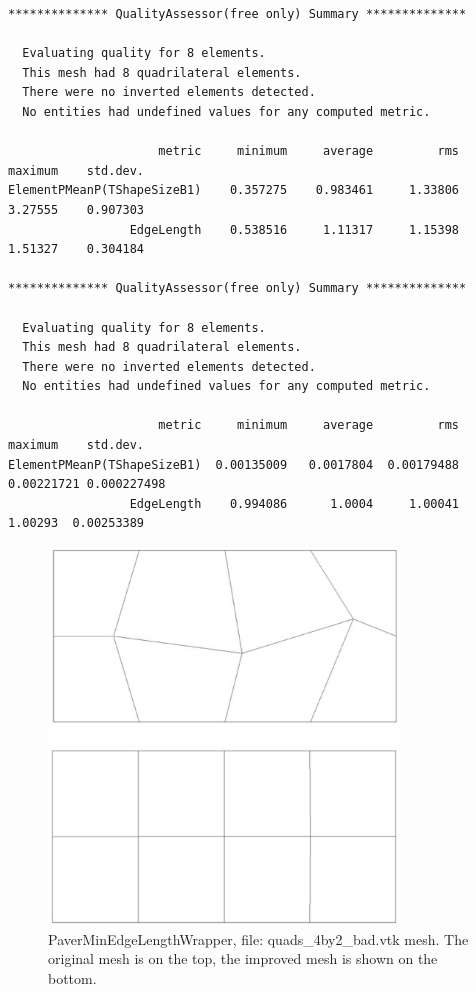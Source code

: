 \begin{verbatim}
************** QualityAssessor(free only) Summary **************

  Evaluating quality for 8 elements.
  This mesh had 8 quadrilateral elements.
  There were no inverted elements detected. 
  No entities had undefined values for any computed metric.

                     metric     minimum     average         rms     maximum    std.dev.
ElementPMeanP(TShapeSizeB1)    0.357275    0.983461     1.33806     3.27555    0.907303
                 EdgeLength    0.538516     1.11317     1.15398     1.51327    0.304184

************** QualityAssessor(free only) Summary **************

  Evaluating quality for 8 elements.
  This mesh had 8 quadrilateral elements.
  There were no inverted elements detected. 
  No entities had undefined values for any computed metric.

                     metric     minimum     average         rms     maximum    std.dev.
ElementPMeanP(TShapeSizeB1)  0.00135009   0.0017804  0.00179488  0.00221721 0.000227498
                 EdgeLength    0.994086      1.0004     1.00041     1.00293  0.00253389
\end{verbatim}


\begin{figure}[htbp]
\begin{center}
    \includegraphics[height=100mm]{min-edge-length.eps}
    \caption{PaverMinEdgeLengthWrapper, file: quads\_4by2\_bad.vtk mesh. The original mesh is on the top, the improved mesh is shown on the bottom.}
    \label{fig:min_edge-length}
\end{center}
\end{figure}
 
